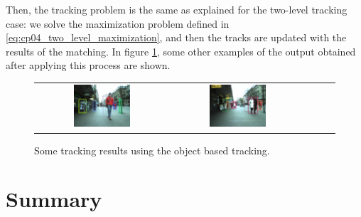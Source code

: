 Then, the tracking problem is the same as explained for the two-level tracking case: we solve the maximization problem defined in \ref{eq:cp04_two_level_maximization}, and then the tracks are updated with the results of the matching. In figure \ref{fig:cp04_tracking_examples_object}, some other examples of the output obtained after applying this process are shown.

\begin{figure}[h!]
    \centering
    \begin{tabular}{ccccc}
      \includegraphics[width=0.45\textwidth]{sequenceObstacle/obstacle15}\label{fig:cp04_object_level_example_30} &
      \includegraphics[width=0.45\textwidth]{sequenceObstacle/obstacle126}\label{fig:cp04_object_level_example_320}
    \end{tabular}
  \caption{Some tracking results using the object based tracking.}\label{fig:cp04_tracking_examples_object}
\end{figure}


\section{Summary}\label{ch:chapter04_07}

